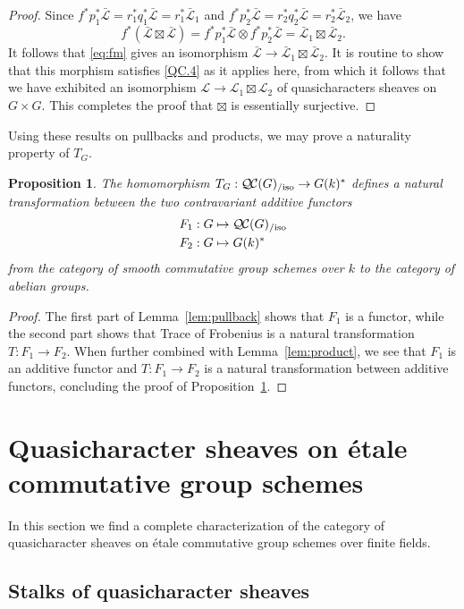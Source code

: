 \documentclass[10pt]{amsart}
\theoremstyle{plain}
\newtheorem{proposition}[theorem]{Proposition}
\theoremstyle{definition}
\theoremstyle{remark}
\newcommand{\Fq}{k}
\newcommand{\TrFrob}[1]{T_{#1}}
\newcommand{\qcs}[1]{{\mathcal{#1}}}
\newcommand{\gqcs}[1]{{\mathcal{\bar #1}}}
\newcommand{\QC}{{\mathcal{Q\hskip-0.8pt C}}}
\newcommand{\QCiso}[1]{\QC(#1)_{/\text{iso}}}
\begin{document}
\begin{proof}
Since $f^*p_1^*\gqcs{L} = r_1^* q_1^* \gqcs{L} = r_1^* \gqcs{L}_1$ and $f^*p_2^*\gqcs{L} = r_2^* q_2^* \gqcs{L} = r_2^*\gqcs{L}_2$,
we have 
\[
f^*(\gqcs{L}\boxtimes \gqcs{L})  = f^*p_1^*\gqcs{L}\otimes f^* p_2^*\gqcs{L} = \gqcs{L}_1\boxtimes \gqcs{L}_2.
\]
It follows that \eqref{eq:fm} gives an isomorphism $\gqcs{L} \to  \gqcs{L}_1\boxtimes \gqcs{L}_2$.
It is routine to show that this morphism satisfies
\ref{QC.4} as it applies here,
from which it follows that we have exhibited an isomorphism
$\qcs{L} \to \qcs{L}_1\boxtimes \qcs{L}_2$ of quasicharacters sheaves on $G\times G$.
This completes the proof that $\boxtimes$ is essentially surjective.
\end{proof}

Using these results on pullbacks and products, we may prove a naturality property of $\TrFrob{G}$.

\begin{proposition}\label{prop:functorialG}
The homomorphism $\TrFrob{G} : \QCiso{G} \to G(\Fq)^*$ defines a natural transformation
between the two contravariant additive functors
\begin{align*}
F_1 : G &\mapsto \QCiso{G} \\
F_2 : G &\mapsto G(\Fq)^*
\end{align*}
from the category of smooth commutative group schemes over $\Fq$ to the category of abelian groups.
\end{proposition}

\begin{proof}
The first part of Lemma~\ref{lem:pullback} shows that $F_1$ is a functor,
while the second part shows that Trace of Frobenius is a natural transformation
$T: F_1 \to F_2$. When further combined with Lemma~\ref{lem:product},
we see that $F_1$ is an additive functor and $T: F_1 \to F_2$ is a natural
transformation between additive functors,
concluding the proof of Proposition~\ref{prop:functorialG}.
\end{proof}

\section{Quasicharacter sheaves on \'etale commutative group schemes} \label{sec:etale}

In this section we find a complete characterization of the category of quasicharacter sheaves on \'etale commutative group schemes over finite fields.

\subsection{Stalks of quasicharacter sheaves}\label{ssec:stalks}
\end{document}
